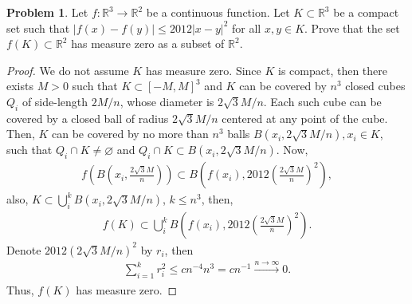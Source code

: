 \documentclass[11pt]{article}
\theoremstyle{definition}
\newtheorem{problem}{Problem}
\theoremstyle{definition}
\begin{document}
\begin{problem}
Let $f:\mathbb{R}^3 \to \mathbb{R}^2$ be a continuous function. Let $K \subset \mathbb{R}^3$ be a compact set such that $\left|f(x)-f(y)\right| \leq 2012 \left|x - y\right|^{2}$ for all $x,y \in K$. Prove that the set $f(K) \subset \mathbb{R}^2$ has measure zero as a subset of $\mathbb{R}^2$.
\end{problem}
\begin{proof}
We do not assume $K$ has measure zero. Since $K$ is compact, then there exists $M > 0$ such that $K \subset [-M,M]^3$ and $K$ can be covered by $n^3$ closed cubes $Q_i$ of side-length $2M/n$, whose diameter is $2\sqrt{3}M/n$. Each such cube can be covered by a closed ball of radius $2\sqrt{3}M/n$ centered at any point of the cube. Then, $K$ can be covered by no more than $n^3$ balls $B\left(x_i, 2\sqrt{3}M/n\right), x_i \in K$, such that $Q_i \cap K \neq \varnothing$ and $Q_i \cap K \subset B\left(x_i, 2\sqrt{3}M/n\right)$. Now, 
\begin{align*}
    f\left( B\left(x_i, \frac{2\sqrt{3}M}{n} \right)\right) \subset B \left(f(x_i), 2012 \left(\frac{2\sqrt{3}M}{n}\right)^2 \right),
\end{align*}
also, $K \subset \bigcup^k_i B\left(x_i, 2\sqrt{3}M/n\right)$, $k \leq n^3$, then,
\begin{align*}
    f(K) \subset \bigcup^k_i B \left(f(x_i), 2012 \left(\frac{2\sqrt{3}M}{n}\right)^2 \right).
\end{align*}
Denote $2012 \left(2\sqrt{3}M/n\right)^2$ by $r_i$, then
\begin{align*}
    \sum^k_{i=1} r_i^2 \leq c n^{-4} n^3 = c n^{-1} \xrightarrow[]{n\to\infty} 0.
\end{align*}
Thus, $f(K)$ has measure zero.
\end{proof}



\medskip
\end{document}
